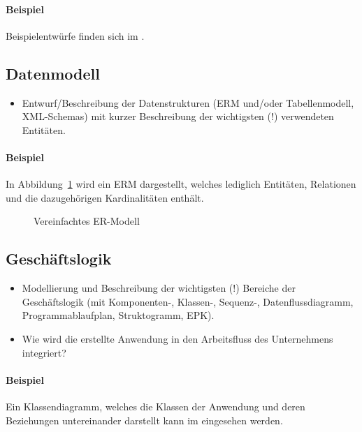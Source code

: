 \paragraph{Beispiel}
Beispielentwürfe finden sich im .


\subsection{Datenmodell}
\label{sec:Datenmodell}

\begin{itemize}
	\item Entwurf/Beschreibung der Datenstrukturen (\zB \acs{ERM} und/oder Tabellenmodell, \acs{XML}-Schemas) mit kurzer Beschreibung der wichtigsten (!) verwendeten Entitäten.
\end{itemize}

\paragraph{Beispiel}
In Abbildung~\ref{fig:ER} wird ein \ac{ERM} dargestellt, welches lediglich Entitäten, Relationen und die dazugehörigen Kardinalitäten enthält. 

\begin{figure}[htb]
\centering
{}
\caption{Vereinfachtes ER-Modell}
\label{fig:ER}
\end{figure} 


\subsection{Geschäftslogik}
\label{sec:Geschaeftslogik}

\begin{itemize}
	\item Modellierung und Beschreibung der wichtigsten (!) Bereiche der Geschäftslogik (\zB mit Kom\-po\-nen\-ten-, Klassen-, Sequenz-, Datenflussdiagramm, Programmablaufplan, Struktogramm, \ac{EPK}).
	\item Wie wird die erstellte Anwendung in den Arbeitsfluss des Unternehmens integriert?
\end{itemize}

\paragraph{Beispiel}
Ein Klassendiagramm, welches die Klassen der Anwendung und deren Beziehungen untereinander darstellt kann im  eingesehen werden.


